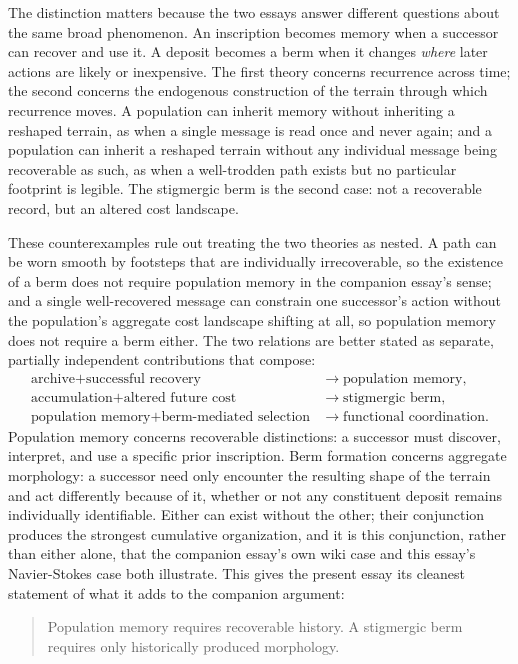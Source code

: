 \documentclass[11pt]{article}
\begin{document}
The distinction matters because the two essays answer different questions about the same broad phenomenon. An inscription becomes memory when a successor can recover and use it. A deposit becomes a berm when it changes \emph{where} later actions are likely or inexpensive. The first theory concerns recurrence across time; the second concerns the endogenous construction of the terrain through which recurrence moves. A population can inherit memory without inheriting a reshaped terrain, as when a single message is read once and never again; and a population can inherit a reshaped terrain without any individual message being recoverable as such, as when a well-trodden path exists but no particular footprint is legible. The stigmergic berm is the second case: not a recoverable record, but an altered cost landscape.

These counterexamples rule out treating the two theories as nested. A path can be worn smooth by footsteps that are individually irrecoverable, so the existence of a berm does not require population memory in the companion essay's sense; and a single well-recovered message can constrain one successor's action without the population's aggregate cost landscape shifting at all, so population memory does not require a berm either. The two relations are better stated as separate, partially independent contributions that compose:
\[
\begin{aligned}
\text{archive} + \text{successful recovery}
&\longrightarrow \text{population memory},\\
\text{accumulation} + \text{altered future cost}
&\longrightarrow \text{stigmergic berm},\\
\text{population memory} + \text{berm-mediated selection}
&\longrightarrow \text{functional coordination}.
\end{aligned}
\]
Population memory concerns recoverable distinctions: a successor must discover, interpret, and use a specific prior inscription. Berm formation concerns aggregate morphology: a successor need only encounter the resulting shape of the terrain and act differently because of it, whether or not any constituent deposit remains individually identifiable. Either can exist without the other; their conjunction produces the strongest cumulative organization, and it is this conjunction, rather than either alone, that the companion essay's own wiki case and this essay's Navier-Stokes case both illustrate. This gives the present essay its cleanest statement of what it adds to the companion argument:
\begin{quote}
Population memory requires recoverable history. A stigmergic berm requires only historically produced morphology.
\end{quote}
\end{document}
